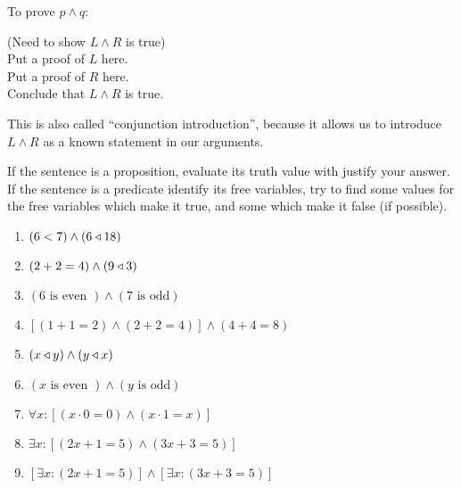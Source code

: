 To prove $p \wedge q$:

\begin{fitch*}
	\textrm{(Need to show $L \wedge R$ is true)}\\
	\textrm{Put a proof of $L$ here.}\\
	\textrm{Put a proof of $R$ here.}\\
	\textrm{Conclude that $L \wedge R$ is true.}\\
\end{fitch*}

This is also called ``conjunction introduction'', because it allows us to introduce $L \wedge R$ as a known statement in our arguments.

\begin{xca}
		If the sentence is a proposition, evaluate its truth value with justify your answer.  If the sentence is a predicate identify its free variables, try to find some values for the free variables which make it true, and some which make it false (if possible).
		
		\begin{enumerate}
				\item $(6 < 7 ) \wedge (6\triangleleft 18)$
				\item $(2+2=4) \wedge (9 \triangleleft 3)$
				\item $(6 \textrm{ is even }) \wedge (7 \textrm{ is odd})$
				\item $[(1+1=2) \wedge (2+2 = 4)] \wedge (4+4 =8)$
				\item $(x \triangleleft y) \wedge (y \triangleleft x)$
				\item $(x \textrm{ is even }) \wedge (y \textrm{ is odd})$ 
				\item $\forall x: [(x \cdot 0 = 0) \wedge (x \cdot 1 = x)]$
				\item $\exists x: [(2x+1 = 5) \wedge (3x+3 = 5)]$
				\item $[\exists x: (2x+1 = 5)] \wedge [\exists x: (3x+3 = 5)]$
			\end{enumerate}
	\end{xca}

